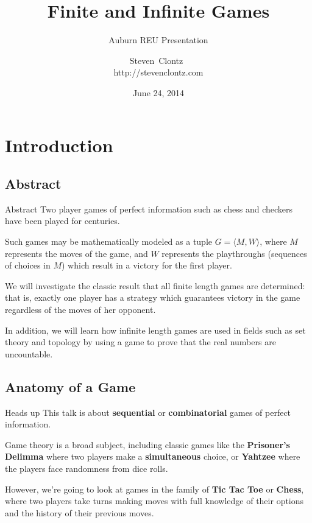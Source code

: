 \documentclass{beamer}
\title
{Finite and Infinite Games}
\subtitle
{Auburn REU Presentation} %
\author%
{Steven~Clontz~\\http://stevenclontz.com}%
\institute[Auburn University] %
{
  Department of Mathematics and Statistics\\
  Auburn University}
\date[14-06-24] %
{June 24, 2014}
\theoremstyle{theorem}
\theoremstyle{definition}
\newcommand{\<}{\langle}
\renewcommand{\>}{\rangle}
\newcommand{\vpause}{\pause\vspace{1em}}
\newcommand{\term}[1]{\textbf{#1}}
\begin{document}

\begin{frame}
  \titlepage
\end{frame}



\section{Introduction}

\subsection{Abstract}

\begin{frame}{Abstract}%
    \small
    Two player games of perfect information such as chess and checkers have
    been played for centuries.

    \vspace{1em}

    Such games may be mathematically modeled as a tuple $G=\<M,W\>$, where $M$
    represents the moves of the game, and $W$ represents the playthroughs
    (sequences of choices in $M$) which result in a victory for the first
    player.

    \vspace{1em}

    We will investigate the classic result that all finite length games are
    determined: that is, exactly one player has a strategy which guarantees
    victory in the game regardless of the moves of her opponent.

    \vspace{1em}

    In addition, we will learn how infinite length games are used in fields
    such as set theory and topology by using a game to prove that the real
    numbers are uncountable.
\end{frame}

\subsection{Anatomy of a Game}

\begin{frame}{Heads up}
  This talk is about \term{sequential} or \term{combinatorial} games
  of perfect information.

  \vpause

  Game theory is a broad subject, including classic games like the
  \term{Prisoner's Delimma} where two players make a \term{simultaneous}
  choice, or \term{Yahtzee} where the players face randomness from
  dice rolls.

  \vpause

  However, we're going to look at games in the family of \term{Tic Tac Toe}
  or \term{Chess}, where two players take turns making moves with full knowledge
  of their options and the history of their previous moves.
\end{frame}
\end{document}

